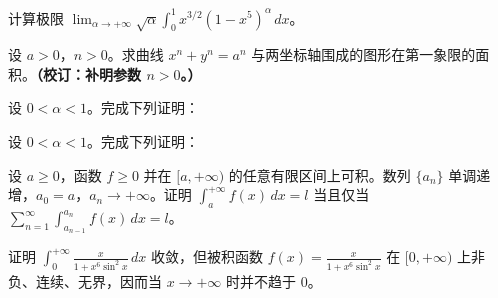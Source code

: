 \noindent\begin{minipage}{\textwidth}
计算极限 $\displaystyle\lim_{\alpha\to+\infty}\sqrt\alpha\int_0^1x^{3/2}(1-x^5)^\alpha\,dx$。
\end{minipage}\par\vfill
\newpage
\noindent\begin{minipage}{\textwidth}
设 $a>0$，$n>0$。求曲线 $x^n+y^n=a^n$ 与两坐标轴围成的图形在第一象限的面积。\textbf{（校订：补明参数 $n>0$。）}
\end{minipage}\par\vfill
\noindent\begin{minipage}{\textwidth}
设 $0<\alpha<1$。完成下列证明：
\end{minipage}\par\vfill
\newpage
\noindent\begin{minipage}{\textwidth}
设 $0<\alpha<1$。完成下列证明：
\SubQ{2}{设 $f,g\ge0$ 且在 $[a,+\infty)$ 上连续，所涉及反常积分均收敛。证明 $\displaystyle\int_a^{+\infty}fg\,dx\le\left(\int_a^{+\infty}f^{1/\alpha}\,dx\right)^\alpha\left(\int_a^{+\infty}g^{1/(1-\alpha)}\,dx\right)^{1-\alpha}$。}
\end{minipage}\par\vfill
\newpage
\noindent\begin{minipage}{\textwidth}
设 $a\ge0$，函数 $f\ge0$ 并在 $[a,+\infty)$ 的任意有限区间上可积。数列 $\{a_n\}$ 单调递增，$a_0=a$，$a_n\to+\infty$。证明 $\displaystyle\int_a^{+\infty}f(x)\,dx=l$ 当且仅当 $\displaystyle\sum_{n=1}^\infty\int_{a_{n-1}}^{a_n}f(x)\,dx=l$。
\end{minipage}\par\vfill
\noindent\begin{minipage}{\textwidth}
证明 $\displaystyle\int_0^{+\infty}\frac{x}{1+x^6\sin^2x}\,dx$ 收敛，但被积函数 $\displaystyle f(x)=\frac{x}{1+x^6\sin^2x}$ 在 $[0,+\infty)$ 上非负、连续、无界，因而当 $x\to+\infty$ 时并不趋于 $0$。
\end{minipage}\par\vfill
